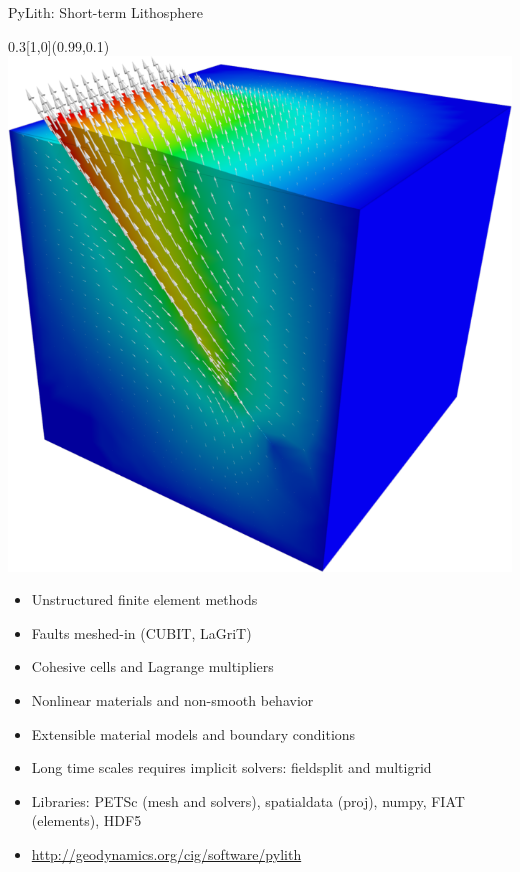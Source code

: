 \documentclass{beamer}
\begin{document}
\begin{frame}{PyLith: Short-term Lithosphere}
  \begin{textblock}{0.3}[1,0](0.99,0.1)
    \includegraphics[width=\textwidth]{figures/PyLithCover.png}
  \end{textblock}
  \vspace{3em}
  \begin{itemize}
  \item Unstructured finite element methods
  \item Faults meshed-in (CUBIT, LaGriT)
  \item Cohesive cells and Lagrange multipliers
  \item Nonlinear materials and non-smooth behavior
  \item Extensible material models and boundary conditions
  \item Long time scales requires implicit solvers: fieldsplit and multigrid
  \item Libraries: PETSc (mesh and solvers), spatialdata (proj), numpy, FIAT (elements), HDF5
  \item \url{http://geodynamics.org/cig/software/pylith}
  \end{itemize}
\end{frame}

\end{document}
